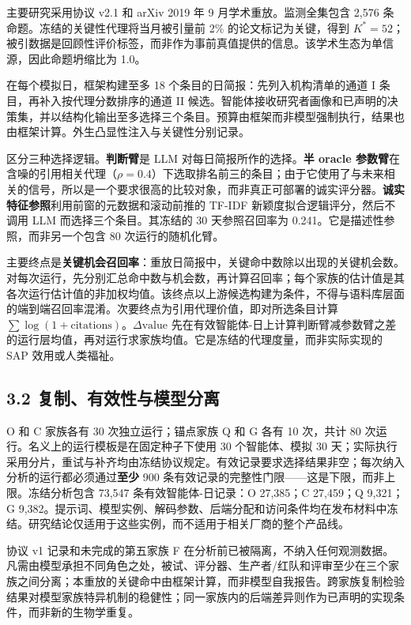 \documentclass[
  chinese,
  conference,10pt]{IEEEtran}
\begin{document}
主要研究采用协议 v2.1 和 arXiv 2019 年 9 月学术重放。监测全集包含 2,576 条命题。冻结的关键性代理将当月被引量前 2\% 的论文标记为关键，得到 \(K^*=52\)；被引数据是回顾性评价标签，而非作为事前真值提供的信息。该学术生态为单信源，因此命题坍缩比为 1.0。

在每个模拟日，框架构建至多 18 个条目的日简报：先列入机构清单的通道 I 条目，再补入按代理分数排序的通道 II 候选。智能体接收研究者画像和已声明的决策集，并以结构化输出至多选择三个条目。预算由框架而非模型强制执行，结果也由框架计算。外生凸显性注入与关键性分别记录。

区分三种选择逻辑。\textbf{判断臂}是 LLM 对每日简报所作的选择。\textbf{半 oracle 参数臂}在含噪的引用相关代理（\(\rho=0.4\)）下选取排名前三的条目；由于它使用了与未来相关的信号，所以是一个要求很高的比较对象，而非真正可部署的诚实评分器。\textbf{诚实特征参照}利用前窗的元数据和滚动前推的 TF-IDF 新颖度拟合逻辑评分，然后不调用 LLM 而选择三个条目。其冻结的 30 天参照召回率为 0.241。它是描述性参照，而非另一个包含 80 次运行的随机化臂。

主要终点是\textbf{关键机会召回率}：重放日简报中，关键命中数除以出现的关键机会数。对每次运行，先分别汇总命中数与机会数，再计算召回率；每个家族的估计值是其各次运行估计值的非加权均值。该终点以上游候选构建为条件，不得与语料库层面的端到端召回率混淆。次要终点为引用代理价值，即对所选条目计算 \(\sum\log(1+\mathrm{citations})\)。\(\Delta\mathrm{value}\) 先在有效智能体-日上计算判断臂减参数臂之差的运行层均值，再对运行求家族均值。它是冻结的代理度量，而非实际实现的 SAP 效用或人类福祉。

\subsection{3.2 复制、有效性与模型分离}\label{ux590dux5236ux6709ux6548ux6027ux4e0eux6a21ux578bux5206ux79bb}

O 和 C 家族各有 30 次独立运行；锚点家族 Q 和 G 各有 10 次，共计 80 次运行。名义上的运行模板是在固定种子下使用 30 个智能体、模拟 30 天；实际执行采用分片，重试与补齐均由冻结协议规定。有效记录要求选择结果非空；每次纳入分析的运行都必须通过\textbf{至少} 900 条有效记录的完整性门限------这是下限，而非上限。冻结分析包含 73,547 条有效智能体-日记录：O 27,385；C 27,459；Q 9,321；G 9,382。提示词、模型实例、解码参数、后端分配和访问条件均在发布材料中冻结。研究结论仅适用于这些实例，而不适用于相关厂商的整个产品线。

协议 v1 记录和未完成的第五家族 F 在分析前已被隔离，不纳入任何观测数据。凡需由模型承担不同角色之处，被试、评分器、生产者/红队和评审至少在三个家族之间分离；本重放的关键命中由框架计算，而非模型自我报告。跨家族复制检验结果对模型家族特异机制的稳健性；同一家族内的后端差异则作为已声明的实现条件，而非新的生物学重复。
\end{document}
